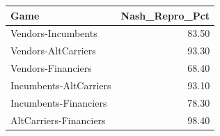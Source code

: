 \begin{tabular}{lr}
\toprule
Game & Nash_Repro_Pct \\
\midrule
Vendors-Incumbents & 83.50 \\
Vendors-AltCarriers & 93.30 \\
Vendors-Financiers & 68.40 \\
Incumbents-AltCarriers & 93.10 \\
Incumbents-Financiers & 78.30 \\
AltCarriers-Financiers & 98.40 \\
\bottomrule
\end{tabular}
